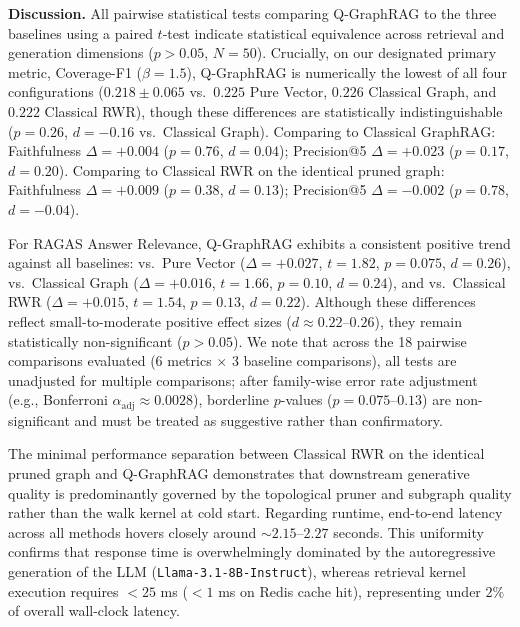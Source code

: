 \documentclass{llncs}
\begin{document}
\textbf{Discussion.}
All pairwise statistical tests comparing Q-GraphRAG to the three baselines using a paired $t$-test indicate statistical equivalence across retrieval and generation dimensions ($p > 0.05$, $N = 50$). Crucially, on our designated primary metric, Coverage-F1 ($\beta = 1.5$), Q-GraphRAG is numerically the lowest of all four configurations ($0.218 \pm 0.065$ vs.\ $0.225$ Pure Vector, $0.226$ Classical Graph, and $0.222$ Classical RWR), though these differences are statistically indistinguishable ($p = 0.26$, $d = -0.16$ vs.\ Classical Graph). Comparing to Classical GraphRAG: Faithfulness $\Delta = +0.004$ ($p = 0.76$, $d = 0.04$); Precision@5 $\Delta = +0.023$ ($p = 0.17$, $d = 0.20$). Comparing to Classical RWR on the identical pruned graph: Faithfulness $\Delta = +0.009$ ($p = 0.38$, $d = 0.13$); Precision@5 $\Delta = -0.002$ ($p = 0.78$, $d = -0.04$). 

For RAGAS Answer Relevance, Q-GraphRAG exhibits a consistent positive trend against all baselines: vs.\ Pure Vector ($\Delta = +0.027$, $t = 1.82$, $p = 0.075$, $d = 0.26$), vs.\ Classical Graph ($\Delta = +0.016$, $t = 1.66$, $p = 0.10$, $d = 0.24$), and vs.\ Classical RWR ($\Delta = +0.015$, $t = 1.54$, $p = 0.13$, $d = 0.22$). Although these differences reflect small-to-moderate positive effect sizes ($d \approx 0.22\text{--}0.26$), they remain statistically non-significant ($p > 0.05$). We note that across the 18 pairwise comparisons evaluated (6 metrics $\times$ 3 baseline comparisons), all tests are unadjusted for multiple comparisons; after family-wise error rate adjustment (e.g., Bonferroni $\alpha_{\text{adj}} \approx 0.0028$), borderline $p$-values ($p = 0.075\text{--}0.13$) are non-significant and must be treated as suggestive rather than confirmatory.

The minimal performance separation between Classical RWR on the identical pruned graph and Q-GraphRAG demonstrates that downstream generative quality is predominantly governed by the topological pruner and subgraph quality rather than the walk kernel at cold start. Regarding runtime, end-to-end latency across all methods hovers closely around $\sim 2.15\text{--}2.27$ seconds. This uniformity confirms that response time is overwhelmingly dominated by the autoregressive generation of the LLM (\texttt{Llama-3.1-8B-Instruct}), whereas retrieval kernel execution requires $<25$ ms ($<1$ ms on Redis cache hit), representing under $2\%$ of overall wall-clock latency.
\end{document}
